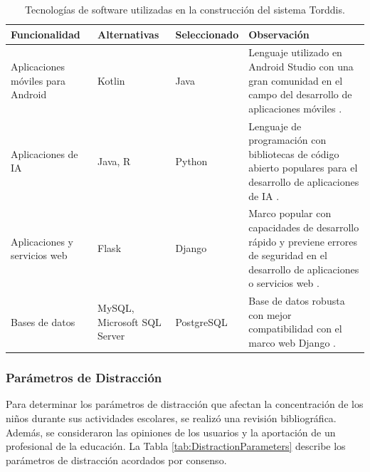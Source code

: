 \documentclass[a4paper,fleqn]{cas-sc}
\begin{document}
					\begin{table}[hbt]
						\caption{Tecnologías de software utilizadas en la construcción del sistema Torddis.}
						\label{table:software-technologies}
						\centering
						\begin{tabular}{p{}p{0.15\textwidth}p{}p{}}
							\hline
							\multicolumn{1}{l}{\textbf{Funcionalidad}} & \multicolumn{1}{l}{\textbf{Alternativas }} & \multicolumn{1}{l}{\textbf{Seleccionado}} & \multicolumn{1}{l}{\textbf{Observación}} \\ \hline
							Aplicaciones móviles para Android & Kotlin & Java & Lenguaje utilizado en Android Studio con una gran comunidad en el campo del desarrollo de aplicaciones móviles \citep{Sharma2021Real-Time}. \\
							Aplicaciones de IA & Java, R & Python & Lenguaje de programación con bibliotecas de código abierto populares para el desarrollo de aplicaciones de IA \citep{Cai2005OnThePerformance}. \\
							Aplicaciones y servicios web & Flask & Django & Marco popular con capacidades de desarrollo rápido y previene errores de seguridad en el desarrollo de aplicaciones o servicios web \citep{Puneet2022ADjango}. \\
							Bases de datos & MySQL, Microsoft SQL Server & PostgreSQL & Base de datos robusta con mejor compatibilidad con el marco web Django \citep{Puneet2022ADjango}. \\ \hline
						\end{tabular}
					\end{table}
				
				\subsubsection*{Parámetros de Distracción}
					Para determinar los parámetros de distracción que afectan la concentración de los niños durante sus actividades escolares, se realizó una revisión bibliográfica. Además, se consideraron las opiniones de los usuarios y la aportación de un profesional de la educación. La Tabla \ref{tab:DistractionParameters} describe los parámetros de distracción acordados por consenso.
					
\end{document}
